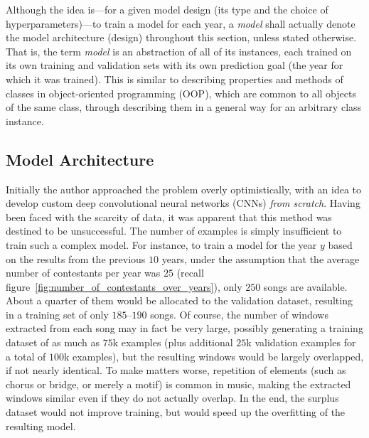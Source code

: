\documentclass[conference, a4paper, 12pt]{IEEEtran}
\begin{document}
    Although the idea is---for a given model design (its type and the choice of hyperparameters)---to train a model for each year, a \emph{model} shall actually denote the model architecture (design) throughout this section, unless stated otherwise. That is, the term \emph{model} is an abstraction of all of its instances, each trained on its own training and validation sets with its own prediction goal (the year for which it was trained). This is similar to describing properties and methods of classes in object-oriented programming (OOP), which are common to all objects of the same class, through describing them in a general way for an arbitrary class instance.

    \par

    \subsection{Model Architecture}
    \label{subsec:model_architecture}

    Initially the author approached the problem overly optimistically, with an idea to develop custom deep convolutional neural networks (CNNs) \emph{from scratch}. Having been faced with the scarcity of data, it was apparent that this method was destined to be unsuccessful. The number of examples is simply insufficient to train such a complex model. For instance, to train a model for the year $ y $ based on the results from the previous $ 10 $ years, under the assumption that the average number of contestants per year was $ 25 $ (recall figure~\ref{fig:number_of_contestants_over_years}), only $ 250 $ songs are available. About a quarter of them would be allocated to the validation dataset, resulting in a training set of only $ 185 $--$ 190 $ songs. Of course, the number of windows extracted from each song may in fact be very large, possibly generating a training dataset of as much as $ 75 $k examples (plus additional $ 25 $k validation examples for a total of $ 100 $k examples), but the resulting windows would be largely overlapped, if not nearly identical. To make matters worse, repetition of elements (such as chorus or bridge, or merely a motif) is common in music, making the extracted windows similar even if they do not actually overlap. In the end, the surplus dataset would not improve training, but would speed up the overfitting of the resulting model.

    \par
\end{document}
